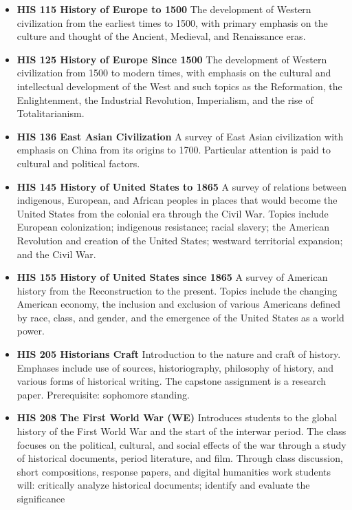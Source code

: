 \documentclass[
  letterpaper,
]{scrbook}
\providecommand{\tightlist}{%
  \setlength{\itemsep}{0pt}\setlength{\parskip}{0pt}}
\begin{document}
\begin{itemize}
\tightlist
\item
  \textbf{HIS 115 History of Europe to 1500} The development of Western
  civilization from the earliest times to 1500, with primary emphasis on
  the culture and thought of the Ancient, Medieval, and Renaissance
  eras.
\item
  \textbf{HIS 125 History of Europe Since 1500} The development of
  Western civilization from 1500 to modern times, with emphasis on the
  cultural and intellectual development of the West and such topics as
  the Reformation, the Enlightenment, the Industrial Revolution,
  Imperialism, and the rise of Totalitarianism.
\item
  \textbf{HIS 136 East Asian Civilization} A survey of East Asian
  civilization with emphasis on China from its origins to 1700.
  Particular attention is paid to cultural and political factors.
\item
  \textbf{HIS 145 History of United States to 1865} A survey of
  relations between indigenous, European, and African peoples in places
  that would become the United States from the colonial era through the
  Civil War. Topics include European colonization; indigenous
  resistance; racial slavery; the American Revolution and creation of
  the United States; westward territorial expansion; and the Civil War.
\item
  \textbf{HIS 155 History of United States since 1865} A survey of
  American history from the Reconstruction to the present. Topics
  include the changing American economy, the inclusion and exclusion of
  various Americans defined by race, class, and gender, and the
  emergence of the United States as a world power.
\item
  \textbf{HIS 205 Historians Craft} Introduction to the nature and craft
  of history. Emphases include use of sources, historiography,
  philosophy of history, and various forms of historical writing. The
  capstone assignment is a research paper. Prerequisite: sophomore
  standing.
\item
  \textbf{HIS 208 The First World War (WE)} Introduces students to the
  global history of the First World War and the start of the interwar
  period. The class focuses on the political, cultural, and social
  effects of the war through a study of historical documents, period
  literature, and film. Through class discussion, short compositions,
  response papers, and digital humanities work students will: critically
  analyze historical documents; identify and evaluate the significance

\end{itemize}
\end{document}
